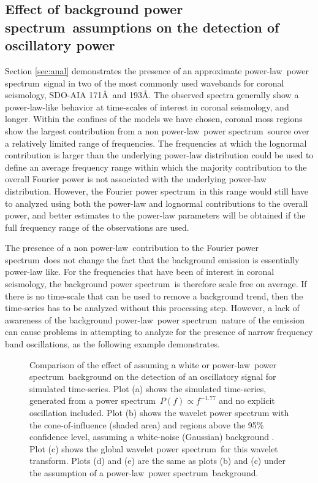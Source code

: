 \documentclass{aastex}
\newcommand{\PS}{power spectrum}
\newcommand{\PL}{power-law}
\newcommand{\Fps}{Fourier \PS}
\begin{document}
\subsection{Effect of background \PS\ assumptions on the
  detection of oscillatory power}
\label{ssec:corseis}

Section \ref{sec:anal} demonstrates the presence of an approximate
\PL\ \PS\ signal in two of the most commonly used wavebands for
coronal seismology, SDO-AIA 171\AA\ and 193\AA.  The observed spectra
generally show a \PL-like behavior at time-scales of interest in
coronal seismology, and longer.  Within the confines of the models we
have chosen, coronal moss regions show the largest contribution from a
non \PL\ \PS\ source over a relatively limited range of frequencies.
The frequencies at which the lognormal contribution is larger than the
underlying power-law distribution could be used to define an average
frequency range within which the majority contribution to the overall
Fourier power is not associated with the underlying power-law
distribution.  However, the \Fps\ in this range would still have to
analyzed using both the power-law and lognormal contributions to the
overall power, and better estimates to the power-law parameters will
be obtained if the full frequency range of the observations are used.

The presence of a non \PL\ contribution to the \Fps\ does not change
the fact that the background emission is essentially power-law like.
For the frequencies that have been of interest in coronal seismology,
the background \PS\ is therefore scale free on average.  If there is
no time-scale that can be used to remove a background trend, then the
time-series has to be analyzed without this processing step.  However,
a lack of awareness of the background \PL\ \PS\ nature of the emission
can cause problems in attempting to analyze for the presence of narrow
frequency band oscillations, as the following example demonstrates.

\begin{figure}
\caption{Comparison of the effect of assuming a white or
  \PL\ \PS\ background on the detection of an oscillatory signal for
  simulated time-series.  Plot (a) shows the simulated time-series,
  generated from a \protect\PS\ \protect$P(f)\propto f^{-1.77}$ and no
  explicit oscillation included.  Plot (b) shows the wavelet power
  spectrum with the cone-of-influence (shaded area) and regions above
  the 95\% confidence level, assuming a white-noise (Gaussian)
  background .  Plot (c) shows the global wavelet \protect\PS\ for
  this wavelet transform.  Plots (d) and (e) are the same as plots (b)
  and (c) under the assumption of a
  \protect\PL\ \protect\PS\ background.}
\label{fig:comparison}
\end{figure}
\end{document}
